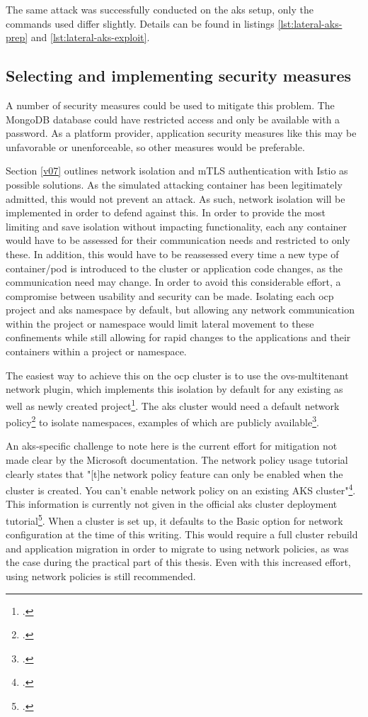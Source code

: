 The same attack was successfully conducted on the \gls{aks} setup, only the commands used differ slightly. Details can be found in listings \ref{lst:lateral-aks-prep} and \ref{lst:lateral-aks-exploit}.

\subsection{Selecting and implementing security measures}

A number of security measures could be used to mitigate this problem.
The MongoDB database could have restricted access and only be available with a password. 
As a platform provider, application security measures like this may be unfavorable or unenforceable, so other measures would be preferable.

Section \ref{v07} outlines network isolation and mTLS authentication with Istio as possible solutions. As the simulated attacking container has been legitimately admitted, this would not prevent an attack. As such, network isolation will be implemented in order to defend against this.
In order to provide the most limiting and save isolation without impacting functionality, each any container would have to be assessed for their communication needs and restricted to only these. In addition, this would have to be reassessed every time a new type of container/pod is introduced to the cluster or application code changes, as the communication need may change. In order to avoid this considerable effort, a compromise between usability and security can be made. Isolating each \gls{ocp} project and \gls{aks} namespace by default, but allowing any network communication within the project or namespace would limit lateral movement to these confinements while still allowing for rapid changes to the applications and their containers within a project or namespace. 

The easiest way to achieve this on the \gls{ocp} cluster is to use the ovs-multitenant network plugin, which implements this isolation by default for any existing as well as newly created project\footcite[][, section 'Overview']{ocpNetworkPlugins}. The \gls{aks} cluster would need a default network policy\footcite[][, section 'Default Policies']{egressNetPol} to isolate namespaces, examples of which are publicly available\footcite[][, section 'Example']{netPolExample}.

\newpage
An \gls{aks}-specific challenge to note here is the current effort for mitigation not made clear by the Microsoft documentation. The network policy usage tutorial clearly states that "[t]he network policy feature can only be enabled when the cluster is created. You can't enable network policy on an existing AKS cluster"\footcite[][, section 'Frequently asked questions']{aksNetPolUse}. This information is currently not given in the official \gls{aks} cluster deployment tutorial\footcite{aksSetup}. When a cluster is set up, it defaults to the Basic option for network configuration at the time of this writing. This would require a full cluster rebuild and application migration in order to migrate to using network policies, as was the case during the practical part of this thesis.
Even with this increased effort, using network policies is still recommended.

